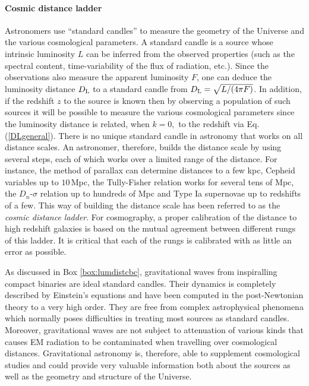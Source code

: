 \paragraph{Cosmic distance ladder} \label{cosmo_parameters}
Astronomers use ``standard candles'' to measure the geometry of
the Universe and the various cosmological parameters. A standard
candle is a source whose intrinsic luminosity $L$ can be inferred
from the observed properties (such as the spectral content,
time-variability of the flux of radiation, etc.). Since the
observations also measure the apparent luminosity $F$, one
can deduce the luminosity distance $D_{\rm L}$ to a standard
candle from $D_{\rm L}=\sqrt{L/(4\pi F)}$.
In addition, if the redshift $z$ to the source is known then
by observing a population of such sources it will be possible to
measure the various cosmological parameters since the luminosity
distance is related, when $k=0,$ to the redshift via Eq.\,(\ref{DLgeneral}).
There is no unique standard candle in astronomy that works on all
distance scales. An astronomer, therefore, builds the distance scale
by using several steps, each of which works over a limited range of
the distance. For instance, the method of parallax can
determine distances to a few kpc,
Cepheid variables up to $10$\,Mpc, the
Tully-Fisher relation works for several tens of Mpc, the $D_n$-$\sigma$
relation up to hundreds of Mpc and Type Ia supernovae up to redshifts
of a few. This way of building the distance scale
has been referred to as the \emph{cosmic distance ladder}. For
cosmography, a proper calibration of the distance to high
redshift galaxies
is based on the mutual agreement between different rungs of this
ladder. It is critical that each of the rungs is calibrated
with as little an error as possible.


As discussed in Box \ref{box:lumdistcbc}, gravitational waves 
from inspiralling compact binaries are ideal standard candles.
Their dynamics is completely described by Einstein's equations
and have been computed in the post-Newtonian theory to a very
high order. They are free from complex astrophysical phenomena
which normally poses difficulties in treating most sources as
standard candles. Moreover, gravitational waves are not subject
to attenuation of various kinds that causes EM radiation to be
contaminated when travelling over cosmological distances. 
Gravitational astronomy is, therefore, able to supplement 
cosmological studies and could provide very valuable information
both about the sources as well as the geometry and structure of
the Universe.


